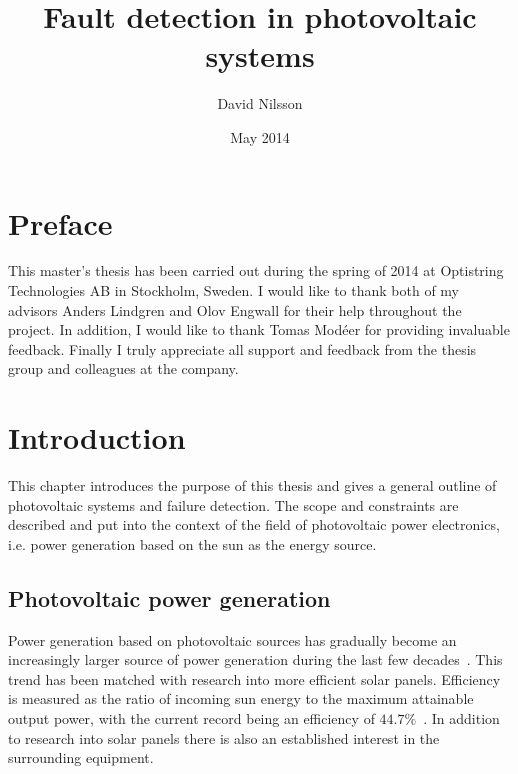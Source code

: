 


\title{Fault detection in photovoltaic systems}
\author{David Nilsson}

\date{May 2014}


\frontmatter
\pagestyle{empty}
\maketitle
{}



\clearpage
\tableofcontents*
\mainmatter
\pagestyle{newchap}

\chapter*{Preface}
This master's thesis has been carried out during the spring of 2014 at Optistring Technologies AB in Stockholm, Sweden.
I would like to thank both of my advisors Anders Lindgren and Olov Engwall for their help throughout the project.
In addition, I would like to thank Tomas Modéer for providing invaluable feedback.
Finally I truly appreciate all support and feedback from the thesis group and colleagues at the company.

\printglossaries
\cleardoublepage
\listoffigures
\clearpage
{}

\chapter{Introduction}
This chapter introduces the purpose of this thesis and gives a general outline of photovoltaic systems and failure detection.
The scope and constraints are described and put into the context of the field of photovoltaic power electronics, i.e. power generation based on the sun as the energy source.

\section{Photovoltaic power generation}
Power generation based on photovoltaic sources has gradually become an increasingly larger source of power generation during the last few decades~\cite{Zhao2010thesis}.
This trend has been matched with research into more efficient solar panels.
Efficiency is measured as the ratio of incoming sun energy to the maximum attainable output power, with the current record being an efficiency of $44.7\%$~\cite{Fraunhofer2013}.
In addition to research into solar panels there is also an established interest in the surrounding equipment.

